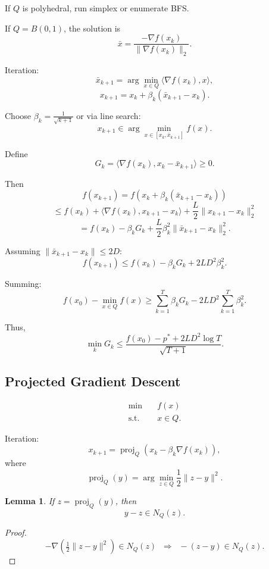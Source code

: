 \documentclass[12pt,oneside]{book}
\numberwithin{equation}{section}
\theoremstyle{definition}
\theoremstyle{plain}
\newtheorem{lemma}{Lemma}[section]
\theoremstyle{remark}
\begin{document}
\medskip

If $Q$ is polyhedral, run simplex or enumerate BFS.

If $Q = B(0,1)$, the solution is
\[
\bar{x} = \frac{-\nabla f(x_k)}{\|\nabla f(x_k)\|_2}.
\]

\medskip

Iteration:
\[
\bar{x}_{k+1} = \arg\min_{x \in Q} \langle \nabla f(x_k), x \rangle,
\]
\[
x_{k+1} = x_k + \beta_k (\bar{x}_{k+1} - x_k).
\]

Choose $\beta_k = \frac{1}{\sqrt{k+1}}$ or via line search:
\[
x_{k+1} \in \arg\min_{x \in [x_k, \bar{x}_{k+1}]} f(x).
\]

\medskip

Define
\[
G_k = \langle \nabla f(x_k), x_k - \bar{x}_{k+1} \rangle \ge 0.
\]

Then
\[
f(x_{k+1}) = f(x_k + \beta_k (\bar{x}_{k+1} - x_k))
\]
\[
\le f(x_k) + \langle \nabla f(x_k), x_{k+1} - x_k \rangle + \frac{L}{2} \|x_{k+1} - x_k\|_2^2
\]
\[
= f(x_k) - \beta_k G_k + \frac{L}{2} \beta_k^2 \|\bar{x}_{k+1} - x_k\|_2^2.
\]

Assuming $\|\bar{x}_{k+1} - x_k\| \le 2D$:
\[
f(x_{k+1}) \le f(x_k) - \beta_k G_k + 2LD^2 \beta_k^2.
\]

Summing:
\[
f(x_0) - \min_{x \in Q} f(x)
\ge \sum_{k=1}^T \beta_k G_k - 2LD^2 \sum_{k=1}^T \beta_k^2.
\]

Thus,
\[
\min_k G_k \le \frac{f(x_0) - p^* + 2LD^2 \log T}{\sqrt{T+1}}.
\]

\subsection{Projected Gradient Descent}

\[
\begin{aligned}
\min \quad & f(x) \\
\text{s.t.} \quad & x \in Q.
\end{aligned}
\]

Iteration:
\[
x_{k+1} = \operatorname{proj}_Q(x_k - \beta_k \nabla f(x_k)),
\]
where
\[
\operatorname{proj}_Q(y)
=
\arg\min_{z \in Q} \frac{1}{2}\|z - y\|^2.
\]

\medskip

\begin{lemma}
If $z = \operatorname{proj}_Q(y)$, then
\[
y - z \in N_Q(z).
\]
\end{lemma}

\begin{proof}
\[
-\nabla \left( \tfrac{1}{2}\|z - y\|^2 \right) \in N_Q(z)
\;\;\Rightarrow\;\;
-(z - y) \in N_Q(z).
\]
\end{proof}
\end{document}

